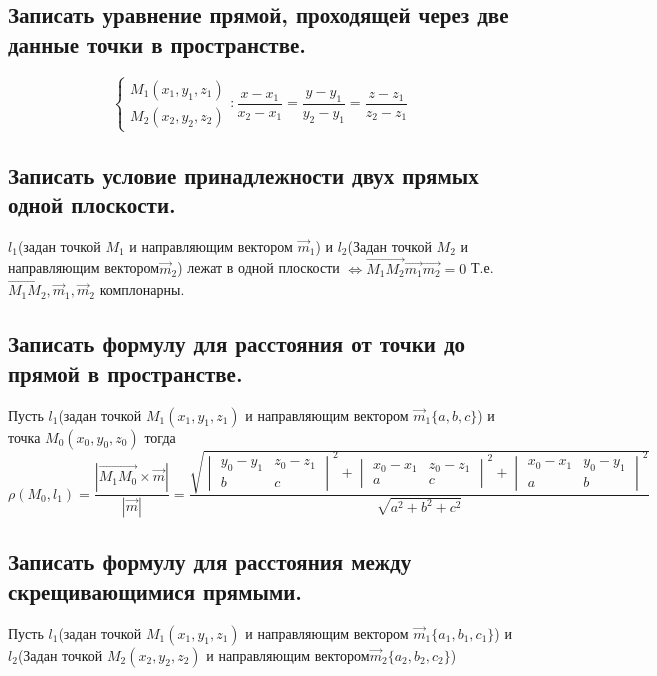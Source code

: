 \documentclass[a4paper, 10pt]{article}
\newcommand{\bvec}[1]{\overrightarrow{#1}}
\renewcommand{\a}{\vec{a}}
\renewcommand{\b}{\vec{b}}
\newcommand{\image}[2]{
	\begin{figure}[H]
		\center{\texttt{[image: img/\#1]} }
    \end{figure}
}
\begin{document}
\image{5.png}{200}

\subsection{Записать уравнение прямой, проходящей через две данные точки в пространстве. }

$$\begin{cases}M_1(x_1,y_1,z_1)\\M_2(x_2,y_2,z_2)\end{cases}: 
\frac{x-x_1}{x_2-x_1} = \frac{y-y_1}{y_2-y_1} = \frac{z-z_1}{z_2-z_1}$$

\subsection{Записать условие принадлежности двух прямых одной плоскости.}

$l_1$(задан точкой $M_1$ и направляющим вектором $\vec{m}_1$) и $l_2$(Задан точкой $M_2$ и направляющим 
вектором$\vec{m}_2$) лежат в одной плоскости $\iff \bvec{M_1M_2}\vec{m_1}\vec{m_2} = 0$
Т.е. $\bvec{M_1M_2}, \vec{m}_1, \vec{m}_2$ комплонарны. 

\subsection{Записать формулу для расстояния от точки до прямой в пространстве.}

Пусть $l_1$(задан точкой $M_1(x_1, y_1, z_1)$ и направляющим вектором $\vec{m}_1\{a,b,c\}$) и точка 
$M_0(x_0,y_0,z_0)$ тогда 
$$\rho(M_0, l_1) = \frac{ |\bvec{M_1M_0}\times\vec{m}| }{ |\vec{m}| } = 
\frac{\sqrt{\begin{vmatrix}y_0-y_1&z_0-z_1\\b&c\end{vmatrix}^2+
\begin{vmatrix}x_0-x_1&z_0-z_1\\a&c\end{vmatrix}^2+
\begin{vmatrix}x_0-x_1&y_0-y_1\\a&b\end{vmatrix}^2}}{\sqrt{a^2+b^2+c^2}}$$

\subsection{Записать формулу для расстояния между скрещивающимися прямыми.}

Пусть $l_1$(задан точкой $M_1(x_1, y_1, z_1)$ и направляющим вектором $\vec{m}_1\{a_1,b_1,c_1\}$) и 
$l_2$(Задан точкой $M_2(x_2, y_2, z_2)$ и направляющим вектором$\vec{m}_2\{a_2,b_2,c_2\}$)
\end{document}
